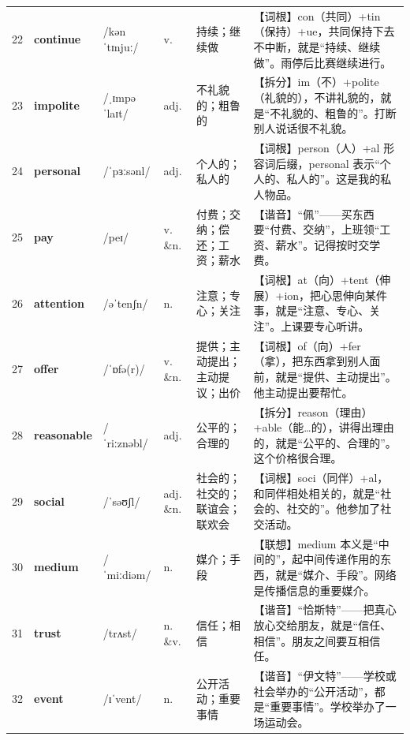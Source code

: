 \documentclass[UTF8,a4paper,11pt,oneside]{ctexbook}
\newcommand{\cellword}[1]{{\bfseries\textcolor{wordcol}{#1}}}
\newcommand{\cellipa}[1]{{\footnotesize\textcolor{ipacol}{#1}}}
\newcommand{\cellpos}[1]{\textcolor{poscol}{#1}}
\newcommand{\cellno}[1]{\textcolor{volcolor!75!black}{#1}}
\begin{document}
{\begin{longtable}{@{}C{0.045\textwidth}L{0.155\textwidth}L{0.175\textwidth}C{0.070\textwidth}L{0.180\textwidth}L{0.282\textwidth}@{}}
\cellno{22} & \cellword{continue} & \cellipa{/kənˈtɪnjuː/} & \cellpos{v.} & 持续；继续做 & \textcolor{tagRoot}{【词根】}con（共同）+tin（保持）+ue，共同保持下去不中断，就是“持续、继续做”。雨停后比赛继续进行。 \\
 \cellno{23} & \cellword{impolite} & \cellipa{/ˌɪmpəˈlaɪt/} & \cellpos{adj.} & 不礼貌的；粗鲁的 & \textcolor{tagSplit}{【拆分】}im（不）+polite（礼貌的），不讲礼貌的，就是“不礼貌的、粗鲁的”。打断别人说话很不礼貌。 \\
\cellno{24} & \cellword{personal} & \cellipa{/ˈpɜːsənl/} & \cellpos{adj.} & 个人的；私人的 & \textcolor{tagRoot}{【词根】}person（人）+al 形容词后缀，personal 表示“个人的、私人的”。这是我的私人物品。 \\
 \cellno{25} & \cellword{pay} & \cellipa{/peɪ/} & \cellpos{v. \&n.} & 付费；交纳；偿还；工资；薪水 & \textcolor{tagSound}{【谐音】}“佩”——买东西要“付费、交纳”，上班领“工资、薪水”。记得按时交学费。 \\
\cellno{26} & \cellword{attention} & \cellipa{/əˈtenʃn/} & \cellpos{n.} & 注意；专心；关注 & \textcolor{tagRoot}{【词根】}at（向）+tent（伸展）+ion，把心思伸向某件事，就是“注意、专心、关注”。上课要专心听讲。 \\
 \cellno{27} & \cellword{offer} & \cellipa{/ˈɒfə(r)/} & \cellpos{v. \&n.} & 提供；主动提出；主动提议；出价 & \textcolor{tagRoot}{【词根】}of（向）+fer（拿），把东西拿到别人面前，就是“提供、主动提出”。他主动提出要帮忙。 \\
\cellno{28} & \cellword{reasonable} & \cellipa{/ˈriːznəbl/} & \cellpos{adj.} & 公平的；合理的 & \textcolor{tagSplit}{【拆分】}reason（理由）+able（能…的），讲得出理由的，就是“公平的、合理的”。这个价格很合理。 \\
 \cellno{29} & \cellword{social} & \cellipa{/ˈsəʊʃl/} & \cellpos{adj. \&n.} & 社会的；社交的；联谊会；联欢会 & \textcolor{tagRoot}{【词根】}soci（同伴）+al，和同伴相处相关的，就是“社会的、社交的”。他参加了社交活动。 \\
\cellno{30} & \cellword{medium} & \cellipa{/ˈmiːdiəm/} & \cellpos{n.} & 媒介；手段 & \textcolor{tagAssoc}{【联想】}medium 本义是“中间的”，起中间传递作用的东西，就是“媒介、手段”。网络是传播信息的重要媒介。 \\
 \cellno{31} & \cellword{trust} & \cellipa{/trʌst/} & \cellpos{n. \&v.} & 信任；相信 & \textcolor{tagSound}{【谐音】}“恰斯特”——把真心放心交给朋友，就是“信任、相信”。朋友之间要互相信任。 \\
\cellno{32} & \cellword{event} & \cellipa{/ɪˈvent/} & \cellpos{n.} & 公开活动；重要事情 & \textcolor{tagSound}{【谐音】}“伊文特”——学校或社会举办的“公开活动”，都是“重要事情”。学校举办了一场运动会。 \\

\end{longtable}}
\end{document}

